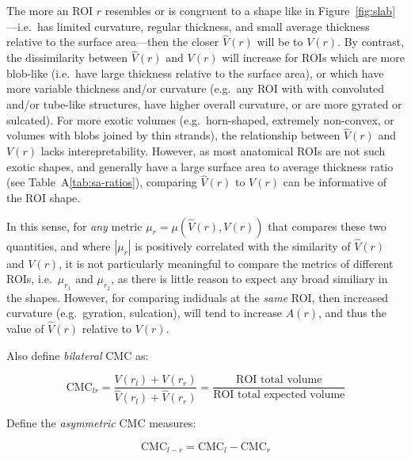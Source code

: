 \documentclass{article}
\newcommand{\note}[2][cyan]{\textbf{NOTE}: \textcolor{#1}{#2}}
\begin{document}
The more an ROI \(r\) resembles or is congruent to a shape like in
Figure~\ref{fig:slab}---i.e.\ has limited curvature, regular thickness, and
small average thickness relative to the surface area---then the closer
\(\hat{V}(r)\) will be to \(V(r)\). By contrast, the dissimilarity between
\(\hat{V}(r)\) and \(V(r)\) will increase for ROIs which are more blob-like
(i.e.\ have large thickness relative to the surface area), or which have more
variable thickness and/or curvature (e.g.\ any ROI with with convoluted
and/or tube-like structures, have higher overall curvature, or are more
gyrated or sulcated). For more exotic volumes (e.g.\ horn-shaped, extremely
non-convex, or volumes with blobs joined by thin strands), the relationship
between \(\hat{V}(r)\) and \(V(r)\) lacks interepretability. However, as most
anatomical ROIs are not such exotic shapes, and generally have a large
surface area to average thickness ratio (see Table~A\ref{tab:sa-ratios}),
comparing \(\hat{V}(r)\) to \(V(r)\) can be informative of the ROI shape.

In this sense, for \emph{any} metric \(\mu_r = \mu(\hat{V}(r), V(r))\) that
compares these two quantities, and where \(|\mu_r|\) is positively correlated
with the similarity of \(\hat{V}(r)\) and \(V(r)\), it is not particularly
meaningful to compare the metrics of different ROIs, i.e.\ \(\mu_{r_1}\) and
\(\mu_{r_2}\), as there is little reason to expect any broad similiary in the
shapes. However, for comparing indiduals at the \emph{same} ROI, then
increased curvature (e.g.\ gyration, sulcation), will tend to increase
\(A(r)\), and thus the value of \(\hat{V}(r)\) relative to \(V(r)\).



Also define \emph{bilateral} CMC as:

\begin{equation} \label{eq:cmc-bilateral}
\text{CMC}_{lr}
=\frac{V(r_l) + V(r_r)}{\hat{V}(r_l) + \hat{V}(r_r)}
=\frac{\text{ROI total volume}}{\text{ROI total expected volume}}
\end{equation}

Define the \emph{asymmetric} CMC measures:

\begin{equation} \label{eq:asym-signed-diff}
\text{CMC}_{l - r} = \text{CMC}_{l} - \text{CMC}_{r}
\end{equation}
\end{document}
